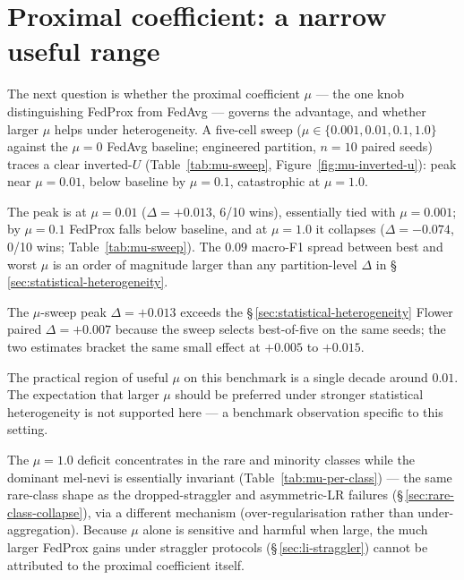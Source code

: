\documentclass[11pt,a4paper]{report}
\begin{document}


\section{Proximal coefficient: a narrow useful range}
\label{sec:mu-sensitivity}

The next question is whether the proximal coefficient $\mu$ --- the one knob
distinguishing FedProx from FedAvg --- governs the advantage, and whether larger
$\mu$ helps under heterogeneity. A five-cell sweep ($\mu \in \{0.001, 0.01, 0.1,
1.0\}$ against the $\mu = 0$ FedAvg baseline; engineered partition, $n=10$ paired
seeds) traces a clear inverted-$U$ (Table~\ref{tab:mu-sweep},
Figure~\ref{fig:mu-inverted-u}): peak near $\mu = 0.01$, below baseline by
$\mu = 0.1$, catastrophic at $\mu = 1.0$.

The peak is at $\mu = 0.01$ ($\Delta = +0.013$, 6/10 wins), essentially tied with
$\mu = 0.001$; by $\mu = 0.1$ FedProx falls below baseline, and at $\mu = 1.0$ it
collapses ($\Delta = -0.074$, 0/10 wins; Table~\ref{tab:mu-sweep}). The $0.09$
macro-F1 spread between best and worst $\mu$ is an order of magnitude larger than
any partition-level $\Delta$ in \S\,\ref{sec:statistical-heterogeneity}.

The $\mu$-sweep peak $\Delta = +0.013$ exceeds the
\S\,\ref{sec:statistical-heterogeneity} Flower paired $\Delta = +0.007$
because the sweep selects best-of-five on the same seeds; the two estimates
bracket the same small effect at $+0.005$ to $+0.015$.

The practical region of useful $\mu$ on this benchmark is a single decade
around $0.01$. The expectation that larger $\mu$ should be preferred under
stronger statistical heterogeneity is not supported here --- a benchmark
observation specific to this setting.

The $\mu = 1.0$ deficit concentrates in the rare and minority classes while the
dominant mel-nevi is essentially invariant (Table~\ref{tab:mu-per-class}) --- the
same rare-class shape as the dropped-straggler and asymmetric-LR failures
(\S\,\ref{sec:rare-class-collapse}), via a different mechanism
(over-regularisation rather than under-aggregation). Because $\mu$ alone is
sensitive and harmful when large, the much larger FedProx gains under straggler
protocols (\S\,\ref{sec:li-straggler}) cannot be attributed to the proximal
coefficient itself.
\end{document}
